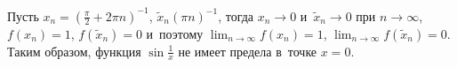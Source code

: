 Пусть $\displaystyle x_{n} = \left( \frac{\pi}{2} + 2\pi n \right)^{-1}$,
$\tilde x_{n} (\pi n)^{-1}$, тогда $x_{n} \to 0$ и~$\tilde x_{n} \to 0$
при $n \to \infty$, $f(x_{n}) = 1$, $f(\tilde x_{n}) = 0$
и~поэтому $\displaystyle \lim_{n \to \infty} f(x_{n}) = 1$,
$\displaystyle \lim_{n \to \infty} f(\tilde x_{n}) = 0 $.
Таким образом, функция $\displaystyle \sin \frac{1}{x}$ не имеет
предела в~точке $x = 0$.

